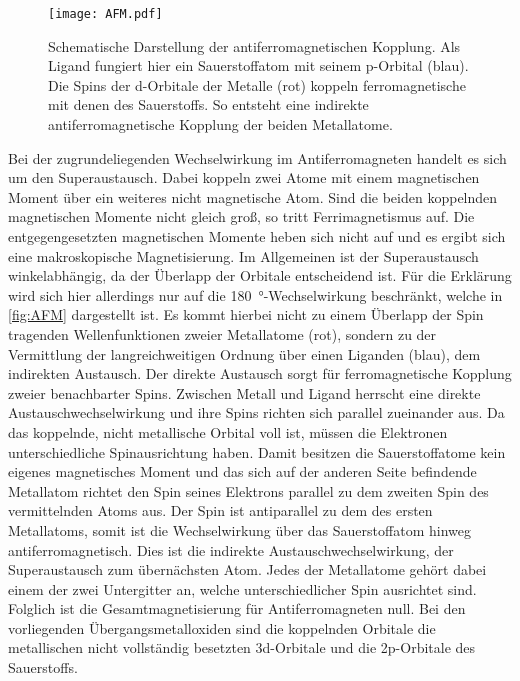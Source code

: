         \begin{figure}
            \centering
            \texttt{[image: AFM.pdf]}
            \caption{Schematische Darstellung der antiferromagnetischen Kopplung.
            Als Ligand fungiert hier ein Sauerstoffatom mit seinem p-Orbital (blau).
            Die Spins der d-Orbitale der Metalle (rot) koppeln ferromagnetische mit denen des Sauerstoffs.
            So entsteht eine indirekte antiferromagnetische Kopplung der beiden Metallatome.}
            \label{fig:AFM}
        \end{figure}
        Bei der zugrundeliegenden Wechselwirkung im Antiferromagneten handelt es sich um den Superaustausch.
        Dabei koppeln zwei Atome mit einem magnetischen Moment über ein weiteres nicht magnetische Atom. 
        Sind die beiden koppelnden magnetischen Momente nicht gleich groß, so tritt Ferrimagnetismus auf.
        Die entgegengesetzten magnetischen Momente heben sich nicht auf und es ergibt sich eine makroskopische Magnetisierung.
        Im Allgemeinen ist der Superaustausch winkelabhängig, da der Überlapp der Orbitale entscheidend ist.
        Für die Erklärung wird sich hier allerdings nur auf die \SI{180}{\degree}-Wechselwirkung beschränkt, welche in \autoref{fig:AFM} dargestellt ist.
        Es kommt hierbei nicht zu einem Überlapp der Spin tragenden Wellenfunktionen zweier Metallatome (rot), sondern zu der Vermittlung der langreichweitigen Ordnung über einen Liganden (blau), dem indirekten Austausch.
        Der direkte Austausch sorgt für ferromagnetische Kopplung zweier benachbarter Spins.
        Zwischen Metall und Ligand herrscht eine direkte Austauschwechselwirkung und ihre Spins richten sich parallel zueinander aus.
        Da das koppelnde, nicht metallische Orbital voll ist, müssen die Elektronen unterschiedliche Spinausrichtung haben.
        Damit besitzen die Sauerstoffatome kein eigenes magnetisches Moment und das sich auf der anderen Seite befindende Metallatom richtet den Spin seines Elektrons parallel zu dem zweiten Spin des vermittelnden Atoms aus.
        Der Spin ist antiparallel zu dem des ersten Metallatoms, somit ist die Wechselwirkung über das Sauerstoffatom hinweg antiferromagnetisch. 
        Dies ist die indirekte Austauschwechselwirkung, der Superaustausch zum übernächsten Atom.
        Jedes der Metallatome gehört dabei einem der zwei Untergitter an, welche unterschiedlicher Spin ausrichtet sind.
        Folglich ist die Gesamtmagnetisierung für Antiferromagneten null.
        Bei den vorliegenden Übergangsmetalloxiden sind die koppelnden Orbitale die metallischen nicht vollständig besetzten 3d-Orbitale und die 2p-Orbitale des Sauerstoffs.
        
